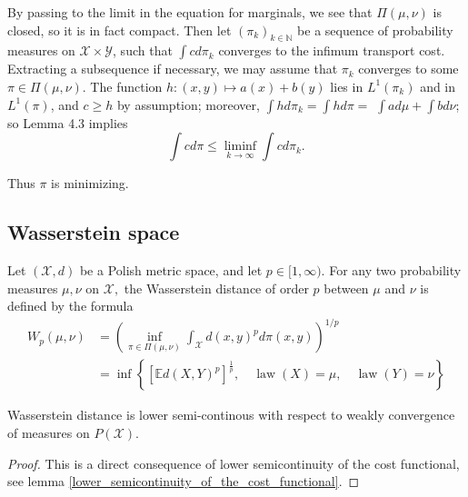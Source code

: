 By passing to the limit in the equation for marginals, we see that \( \Pi ( \mu , \nu ) \) is closed, so it is in fact compact. Then let \( \left( \pi _ { k } \right) _ { k \in \mathbb { N } } \) be a sequence of probability measures on \( \mathcal { X } \times \mathcal { Y } \), such that \( \int c d \pi _ { k } \) converges to the infimum transport cost. Extracting a subsequence if necessary, we may assume that \( \pi _ { k } \) converges to some \( \pi \in \Pi ( \mu , \nu ) . \) The function \( h: ( x , y ) \longmapsto a ( x ) + b ( y ) \) lies in \( L ^ { 1 } \left( \pi _ { k } \right) \) and in \( L ^ { 1 } ( \pi ) \), and \( c \geq h \) by assumption; moreover, \( \int h d \pi _ { k } = \int h d \pi = \) \( \int a d \mu + \int b d \nu \); so Lemma 4.3 implies
\[ \int c d \pi \leq \liminf _ { k \rightarrow \infty } \int c d \pi _ { k }. \]

Thus $\pi$ is minimizing.
\subsection{Wasserstein space}

\begin{defn}
	\label{Wasserstein_distance}
	Let  \(( \mathcal { X } , d ) \) be a Polish metric space, and let \( p \in [ 1 , \infty ) . \) For any two probability measures \( \mu , \nu \) on \( \mathcal { X } , \) the Wasserstein distance of order \( p \) between \( \mu \) and \( \nu \) is defined by the formula
	\begin{align*}
		W _ { p } ( \mu , \nu ) & = \left( \inf _ { \pi \in \Pi ( \mu , \nu ) } \int _ { \mathcal { X } } d ( x , y ) ^ { p } d \pi ( x , y ) \right) ^ { 1 / p }                                                      \\
		                        & = \inf \left\{ \left[ \mathbb { E } d ( X , Y ) ^ { p } \right] ^ { \frac { 1 } { p } } , \quad \operatorname { law } ( X ) = \mu , \quad \operatorname { law } ( Y ) = \nu \right\}
	\end{align*}
\end{defn}

\begin{lem}
	\label{lower_semicontinous_Wasserstein_distance}
	Wasserstein distance is lower semi-continous with respect to weakly convergence of measures on $P(\mathscr{X})$.
\end{lem}

\begin{proof}
	This is a direct consequence of lower semicontinuity of the cost functional, see lemma \ref{lower_semicontinuity_of_the_cost_functional}.
\end{proof}

